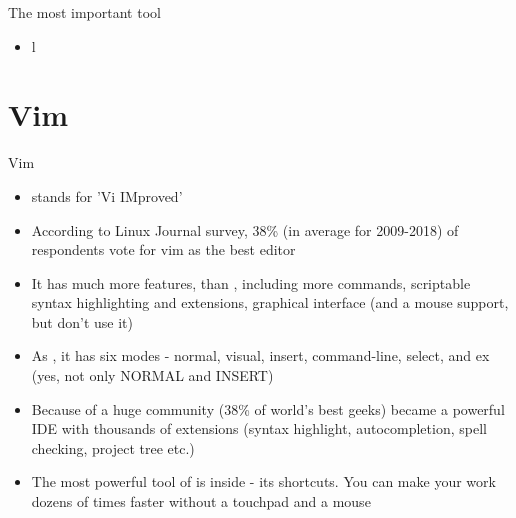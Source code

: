 \documentclass[usenames,dvipsnames,10pt,aspectratio=169]{beamer}
\begin{document}
\begin{frame}{The most important tool}
    \begin{itemize}
        \item l
    \end{itemize}
\end{frame}



\section{Vim}

\begin{frame}{Vim}
    \begin{itemize}
        \item {} stands for 'Vi IMproved'
        \item According to Linux Journal survey, 38\% (in average for 2009-2018) of respondents vote for vim as the best editor
        \item It has much more features, than , including more commands, scriptable syntax highlighting and extensions, graphical interface (and a mouse support, but don't use it)
        \item As , it has six modes - normal, visual, insert, command-line, select, and ex (yes, not only NORMAL and INSERT)
        \item Because of a huge community (38\% of world's best geeks)  became a powerful IDE with thousands of extensions (syntax highlight, autocompletion, spell checking, project tree etc.)
        \item The most powerful tool of  is inside - its shortcuts. You can make your work dozens of times faster without a touchpad and a mouse
    \end{itemize}
\end{frame}
\end{document}
